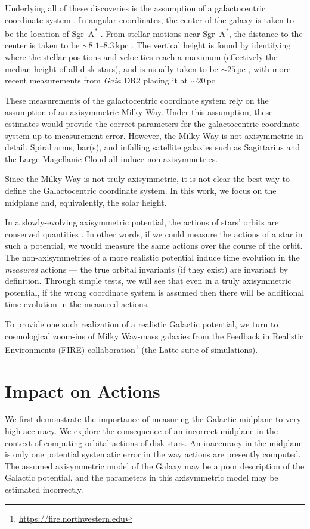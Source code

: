 \documentclass[twocolumn]{aastex62}
\newcommand{\pc}{\text{pc}}
\newcommand{\kpc}{\text{kpc}}
\begin{document}
Underlying all of these discoveries is the assumption of a galactocentric
coordinate system \citep{2008gady.book.....B}. In angular
coordinates, the center of the galaxy is taken to be the location of
Sgr~A\textsuperscript{*} \citep[e.g.][]{2004ApJ...616..872R}. From stellar
motions near Sgr~A\textsuperscript{*}, the distance to the center is taken to
be $\sim 8.1\text{--}8.3\,\kpc$
\citep{2009ApJ...692.1075G,2018A&A...615L..15G}. The vertical height is found
by identifying where the stellar positions and velocities reach a maximum
(effectively the median height of all disk stars), and is usually taken to be
$\sim 25\,\pc$ \citep{2001ApJ...553..184C}, with more recent measurements from
{\em Gaia} DR2 placing it at $\sim 20\,\pc$ \citep{2019MNRAS.482.1417B}.

These measurements of the galactocentric coordinate system rely on the
assumption of an axisymmetric Milky Way. Under this assumption, these
estimates would provide the correct parameters for the galactocentric
coordinate system up to measurement error. However, the Milky Way is not
axisymmetric in detail. Spiral arms, bar(s), and infalling satellite galaxies
such as Sagittarius and the Large Magellanic Cloud all induce
non-axisymmetries.

Since the Milky Way is not truly axisymmetric, it is not clear the best way to
define the Galactocentric coordinate system. In this work, we focus on the midplane and, equivalently, the solar height. 

In a slowly-evolving axisymmetric potential, the actions of stars' orbits are
conserved quantities \citep{2008gady.book.....B,2014RvMP...86....1S}. In other
words, if we could measure the actions of a star in such a potential, we would
measure the same actions over the course of the orbit. The non-axisymmetries
of a more realistic potential induce time evolution in the {\em measured}
actions --- the true orbital invariants (if they exist) are invariant by
definition. Through simple tests, we will see that even in a truly
axisymmetric potential, if the wrong coordinate system is assumed then there
will be additional time evolution in the measured actions.

To provide one such realization of a realistic Galactic potential, we turn to
cosmological zoom-ins of Milky Way-mass galaxies from the Feedback in
Realistic Environments (FIRE)
collaboration\footnote{\url{https://fire.northwestern.edu}} (the Latte suite
of simulations).

\section{Impact on Actions} \label{sec:ref_frame}
We first demonstrate the importance of measuring the Galactic midplane to very
high accuracy. We explore the consequence of an incorrect midplane in the
context of computing orbital actions of disk stars. An inaccuracy in the
midplane is only one potential systematic error in the way actions are
presently computed. The assumed axisymmetric model of the Galaxy may be a poor
description of the Galactic potential, and the parameters in this axisymmetric
model may be estimated incorrectly.
\end{document}
